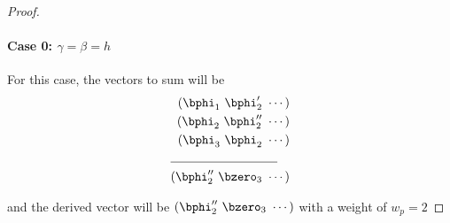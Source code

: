 \documentclass[11pt, oneside, dvipdfmx]{book}
\begin{document}
\begin{proof}
\paragraph{Case 0: $\gamma=\beta=h$ \newline}

 For this case, the vectors to sum will be 
 \begin{align*}
(\bphi_1~\bphi'_2~\cdots)\\
(\bphi_2~\bphi''_2~\cdots)\\
(\bphi_3~\bphi_2~\cdots)\\
\cline{1-2}
(\bphi''_2~\bzero_{3}~\cdots)
\end{align*}
 
and  the derived vector will be $(\bphi''_2~\bzero_{3}~\cdots)$ with a weight of $w_p=2$
 
 


\end{proof}
\end{document}
